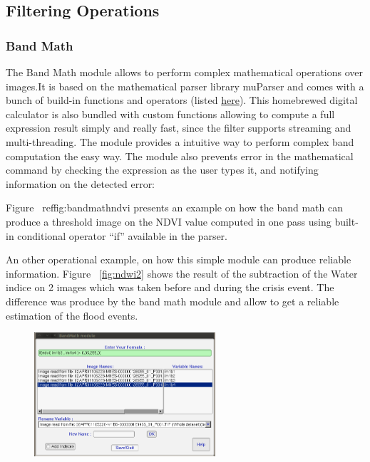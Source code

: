 \subsection{Filtering Operations}
\subsubsection{Band Math}
The Band Math module allows to perform complex mathematical operations
over images.It is based on the mathematical parser library muParser
and comes with a bunch of build-in functions and operators (listed
\href{http://muparser.sourceforge.net/mup_features.html#idDef2}{here}). This
homebrewed digital calculator is also bundled with custom functions
allowing to compute a full expression result simply and really fast,
since the filter supports streaming and multi-threading.  The \mont
module provides a intuitive way to perform complex band computation
the easy way. The module also prevents error in the mathematical
command by checking the expression as the user types it, and notifying
information on the detected error:

Figure ~ref{fig:bandmathndvi} presents an example on how the band math
can produce a threshold image on the NDVI value computed in one pass
using built-in conditional operator ``if'' available in the parser.

An other operational example, on how this simple module can produce
reliable information.  Figure ~\ref{fig:ndwi2} shows the result of the
subtraction of the Water indice on 2 images which was taken before and
during the crisis event.  The difference was produce by the band math
module and allow to get a reliable estimation of the flood events.

\begin{figure}
  \center
  \includegraphics[width=0.6\textwidth]{../Art/MonteverdiImages/monteverdi_band_math_ndvi_threshold.png}
  \label{fig:bandmathndvi}
\end{figure}

